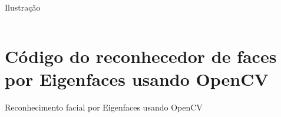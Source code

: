 \begin{apendicesenv}
\begin{code}
\caption{Ilustração }
\label{cod:pca_opencv}
\inputminted{python}{codigos/ilustra_eigenfaces.py}
\end{code}

\chapter{Código do reconhecedor de faces por Eigenfaces usando OpenCV}\label{cap:eigenfaces_opencv}

\begin{code}
\caption{Reconhecimento facial por Eigenfaces usando OpenCV}
\label{cod:eigenfaces_opencv}
\inputminted{python}{codigos/eigenfaces.py}
\end{code}

\end{apendicesenv}
